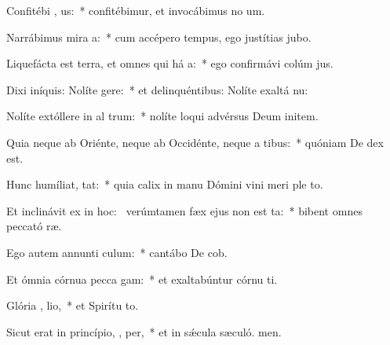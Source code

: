 \item Confitébi , us:~* confitébimur, et invocábimus no um.
\item Narrábimus mira a:~* cum accépero tempus, ego justítias jubo.
\item Liquefácta est terra, et omnes qui há  a:~* ego confirmávi colúm jus.
\item Dixi iníquis: Nolíte  gere:~* et delinquéntibus: Nolíte exaltá nu:
\item Nolíte extóllere in al  trum:~* nolíte loqui advérsus Deum initem.
\item Quia neque ab Oriénte, neque ab Occidénte, neque a  tibus:~* quóniam De dex est.
\item Hunc humíliat,   tat:~* quia calix in manu Dómini vini meri ple to.
\item Et inclinávit ex  in hoc:~\pscross{} verúmtamen fæx ejus non est ta:~* bibent omnes peccató ræ.
\item Ego autem annunti  culum:~* cantábo De cob.
\item Et ómnia córnua pecca gam:~* et exaltabúntur córnu ti.
\item Glória ,  lio,~* et Spirítu to.
\item Sicut erat in princípio,  ,  per,~* et in sǽcula sæculó. men.
